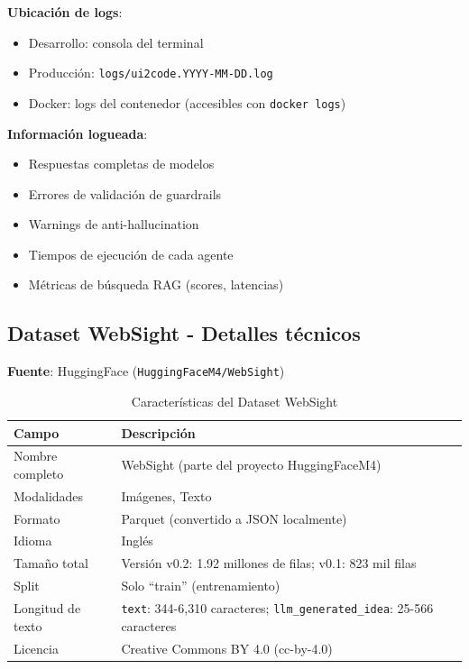 \documentclass[12pt,a4paper]{article}
\begin{document}
\textbf{Ubicación de logs}:
\begin{itemize}
    \item Desarrollo: consola del terminal
    \item Producción: \texttt{logs/ui2code.YYYY-MM-DD.log}
    \item Docker: logs del contenedor (accesibles con \texttt{docker logs})
\end{itemize}

\textbf{Información logueada}:
\begin{itemize}
    \item Respuestas completas de modelos
    \item Errores de validación de guardrails
    \item Warnings de anti-hallucination
    \item Tiempos de ejecución de cada agente
    \item Métricas de búsqueda RAG (scores, latencias)
\end{itemize}

\subsection{Dataset WebSight - Detalles técnicos}

\textbf{Fuente}: HuggingFace (\texttt{HuggingFaceM4/WebSight})

\begin{table}[H]
\centering
\caption{Características del Dataset WebSight}
\begin{tabular}{lp{10cm}}
\toprule
\textbf{Campo} & \textbf{Descripción} \\
\midrule
Nombre completo & WebSight (parte del proyecto HuggingFaceM4) \\
Modalidades & Imágenes, Texto \\
Formato & Parquet (convertido a JSON localmente) \\
Idioma & Inglés \\
Tamaño total & Versión v0.2: 1.92 millones de filas; v0.1: 823 mil filas \\
Split & Solo ``train'' (entrenamiento) \\
Longitud de texto & \texttt{text}: 344-6,310 caracteres; \texttt{llm\_generated\_idea}: 25-566 caracteres \\
Licencia & Creative Commons BY 4.0 (cc-by-4.0) \\
\bottomrule
\end{tabular}
\end{table}
\end{document}
